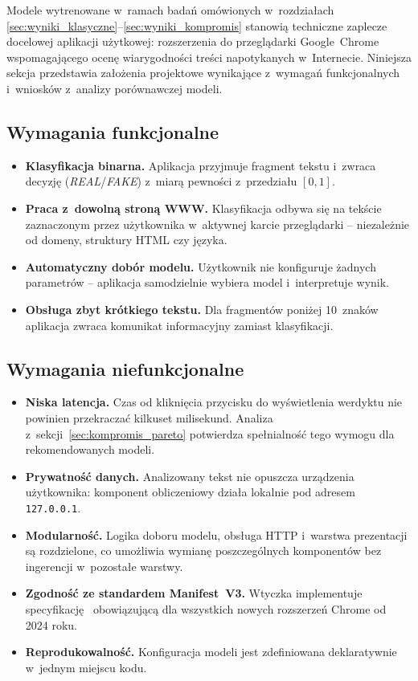 \documentclass[oneside,polski,logo]{amuthesis}
\begin{document}
Modele wytrenowane w~ramach badań omówionych w~rozdziałach
\ref{sec:wyniki_klasyczne}--\ref{sec:wyniki_kompromis} stanowią
techniczne zaplecze docelowej aplikacji użytkowej: rozszerzenia
do przeglądarki Google~Chrome wspomagającego ocenę wiarygodności
treści napotykanych w~Internecie. Niniejsza sekcja przedstawia
założenia projektowe wynikające z~wymagań funkcjonalnych i~wniosków
z~analizy porównawczej modeli.

\subsection*{Wymagania funkcjonalne}

\begin{itemize}
  \item \textbf{Klasyfikacja binarna.} Aplikacja przyjmuje fragment
        tekstu i~zwraca decyzję (\textit{REAL}/\textit{FAKE}) z~miarą
        pewności z~przedziału $[0,1]$.
  \item \textbf{Praca z~dowolną stroną WWW.} Klasyfikacja odbywa się
        na tekście zaznaczonym przez użytkownika w~aktywnej karcie
        przeglądarki -- niezależnie od domeny, struktury HTML czy języka.
  \item \textbf{Automatyczny dobór modelu.} Użytkownik nie konfiguruje
        żadnych parametrów -- aplikacja samodzielnie wybiera model
        i~interpretuje wynik.
  \item \textbf{Obsługa zbyt krótkiego tekstu.} Dla fragmentów poniżej
        10~znaków aplikacja zwraca komunikat informacyjny zamiast
        klasyfikacji.
\end{itemize}

\subsection*{Wymagania niefunkcjonalne}

\begin{itemize}
  \item \textbf{Niska latencja.} Czas od kliknięcia przycisku do
        wyświetlenia werdyktu nie powinien przekraczać kilkuset
        milisekund. Analiza z~sekcji~\ref{sec:kompromis_pareto}
        potwierdza spełnialność tego wymogu dla rekomendowanych modeli.
  \item \textbf{Prywatność danych.} Analizowany tekst nie opuszcza
        urządzenia użytkownika: komponent obliczeniowy działa lokalnie
        pod adresem \texttt{127.0.0.1}.
  \item \textbf{Modularność.} Logika doboru modelu, obsługa HTTP
        i~warstwa prezentacji są rozdzielone, co umożliwia wymianę
        poszczególnych komponentów bez ingerencji w~pozostałe warstwy.
  \item \textbf{Zgodność ze standardem Manifest~V3.} Wtyczka
        implementuje specyfikację~\cite{chrome_mv3} obowiązującą
        dla wszystkich nowych rozszerzeń Chrome od 2024 roku.
  \item \textbf{Reprodukowalność.} Konfiguracja modeli jest
        zdefiniowana deklaratywnie w~jednym miejscu kodu.
\end{itemize}
\end{document}
